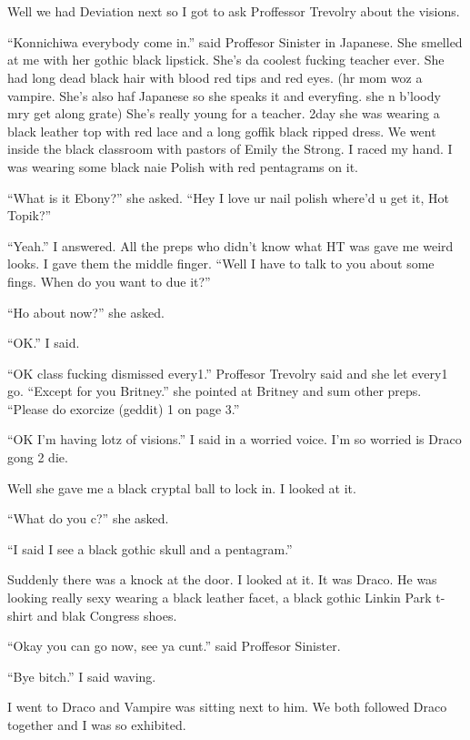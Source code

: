 \section{}



Well we had Deviation next so I got to ask Proffessor Trevolry about the visions.

\enquote{Konnichiwa everybody come in.} said Proffesor Sinister in Japanese. She smelled at me with her gothic black lipstick. She's da coolest fucking teacher ever. She had long dead black hair with blood red tips and red eyes. (hr mom woz a vampire. She's also haf Japanese so she speaks it and everyfing. she n b'loody mry get along grate) She's really young for a teacher. 2day she was wearing a black leather top with red lace and a long goffik black ripped dress. We went inside the black classroom with pastors of Emily the Strong. I raced my hand. I was wearing some black naie Polish with red pentagrams on it.

\enquote{What is it Ebony?} she asked. \enquote{Hey I love ur nail polish where'd u get it, Hot Topik?}

\enquote{Yeah.} I answered. All the preps who didn't know what HT was gave me weird looks. I gave them the middle finger. \enquote{Well I have to talk to you about some fings. When do you want to due it?}

\enquote{Ho about now?} she asked.

\enquote{OK.} I said.

\enquote{OK class fucking dismissed every1.} Proffesor Trevolry said and she let every1 go. \enquote{Except for you Britney.} she pointed at Britney and sum other preps. \enquote{Please do exorcize (geddit) 1 on page 3.}

\enquote{OK I'm having lotz of visions.} I said in a worried voice. I'm so worried is Draco gong 2 die.

Well she gave me a black cryptal ball to lock in. I looked at it.

\enquote{What do you c?} she asked.

\enquote{I said I see a black gothic skull and a pentagram.}

Suddenly there was a knock at the door. I looked at it. It was Draco. He was looking really sexy wearing a black leather facet, a black gothic Linkin Park t-shirt and blak Congress shoes.

\enquote{Okay you can go now, see ya cunt.} said Proffesor Sinister.

\enquote{Bye bitch.} I said waving.

I went to Draco and Vampire was sitting next to him. We both followed Draco together and I was so exhibited.

